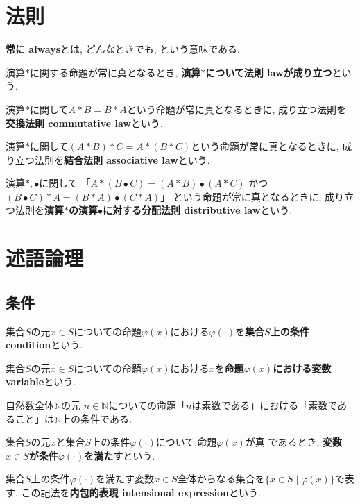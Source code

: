 \section{法則}
\begin{mean}
{\bf 常に always}とは, どんなときでも, という意味である.
\end{mean}
\begin{usage}
演算$*$に関する命題が常に真となるとき, {\bf 演算$\ast$について法則 lawが成り立つ}という.
\end{usage}
\begin{Def}
演算$\ast$に関して$A\ast B=B\ast A$という命題が常に真となるときに, 成り立つ法則を{\bf 交換法則 commutative law}という.
\end{Def}
\begin{Def}
演算$\ast$に関して$(A\ast B)\ast C=A\ast(B\ast C)$という命題が常に真となるときに, 成り立つ法則を{\bf 結合法則 associative law}という.
\end{Def}
\begin{Def}
演算$\ast,\bullet$に関して
「$A\ast(B\bullet C)=(A\ast B)\bullet(A\ast C)$
かつ
$(B\bullet C)\ast A=(B\ast A)\bullet(C\ast A)$」
という命題が常に真となるときに, 成り立つ法則を{\bf 演算$\ast$の演算$\bullet$に対する分配法則 distributive law}という.

\end{Def}

\section{述語論理}
\subsection{条件}
\begin{usage}集合$S$の元$x\in S$についての命題$\varphi(x)$における$\varphi(\cdot)$を{\bf 集合$S$上の条件 condition}という.
\end{usage}
\begin{usage}集合$S$の元$x\in S$についての命題$\varphi(x)$における$x$を{\bf 命題$\varphi(x)$における変数 variable}という.
\end{usage}
\begin{example}
自然数全体$\mathbb{N}$の元 $n\in\mathbb{N}$についての命題「$n$は素数である」における「素数であること」は$\mathbb{N}$上の条件である.
\end{example}

\begin{usage}
集合$S$の元$x$と集合$S$上の条件$\varphi(\cdot)$について,命題$\varphi(x)$が真
であるとき,
{\bf 変数$x\in S$が条件$\varphi(\cdot)$を満たす}という.
\end{usage}
\begin{Notation}
集合$S$上の条件$\varphi(\cdot)$を満たす変数$x\in S$全体からなる集合を$\{x\in S\mid \varphi(x)\}$で表す. この記法を{\bf 内包的表現 intensional expression}という.
\end{Notation}
